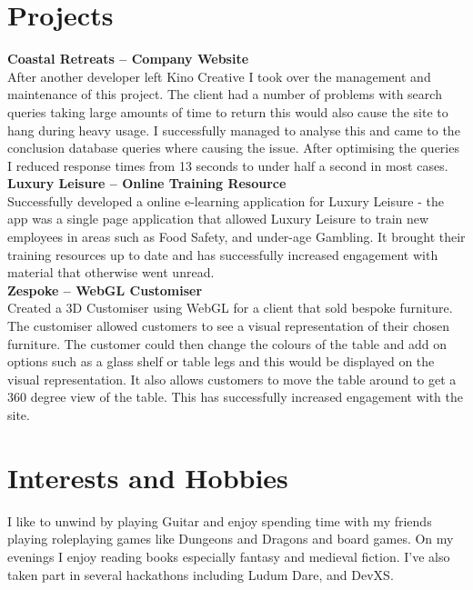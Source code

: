 \documentclass[10pt]{article}
\begin{document}
\section*{Projects}
{\bf Coastal Retreats -- Company Website}\\
After another developer left Kino Creative I took over the management and maintenance of this project. The client had a number of problems with search queries taking large amounts of time to return this would also cause the site to hang during heavy usage. I successfully managed to analyse this and came to the conclusion database queries where causing the issue. After optimising the queries I reduced response times from 13 seconds to under half a second in most cases.\\
{\bf Luxury Leisure -- Online Training Resource}\\
Successfully developed a online e-learning application for Luxury Leisure - the app was a single page application that allowed Luxury Leisure to train new employees in areas such as Food Safety, and under-age Gambling. It brought their training resources up to date and has successfully increased engagement with material that otherwise went unread.\\
{\bf Zespoke -- WebGL Customiser}\\
Created a 3D Customiser using WebGL for a client that sold bespoke furniture. The customiser allowed customers to see a visual representation of their chosen furniture. The customer could then change the colours of the table and add on options such as a glass shelf or table legs and this would be displayed on the visual representation. It also allows customers to move the table around to get a 360 degree view of the table. This has successfully increased engagement with the site.\\
\section*{Interests and Hobbies}
I like to unwind by playing Guitar and enjoy spending time with my friends playing roleplaying games like Dungeons and Dragons and board games. On my evenings I enjoy reading books especially fantasy and medieval fiction. I've also taken part in several hackathons including Ludum Dare, and DevXS.
\end{document}
